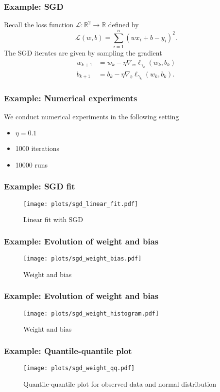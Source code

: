 \documentclass[17pt,institute=e10]{tuhh_presentation}
\newcommand{\R}{\mathbb{R}}
\newcommand{\CL}{\mathcal{L}}
\begin{document}
\begin{frame}[fragile]
  \frametitle{Example: SGD}
  Recall the loss function $\CL : \R^2 \rightarrow \R$ defined by
  \begin{equation*}
    \CL(w,b) = \sum_{i = 1}^{n} \left(w x_i + b - y_i\right)^2.
  \end{equation*}
  The SGD iterates are given by sampling the gradient
  \begin{align*}
    w_{k+1} &= w_k - \eta \nabla_w \ell_{\gamma_k}(w_k, b_k) \\
    b_{k+1} &= b_k - \eta \nabla_b \ell_{\gamma_k}(w_k, b_k).
  \end{align*}
\end{frame}
\begin{frame}[fragile]
  \frametitle{Example: Numerical experiments}
    We conduct numerical experiments in the following setting
    \begin{itemize}
      \item $\eta = 0.1$
      \item 1000 iterations 
      \item 10000 runs
    \end{itemize}
\end{frame}
\begin{frame}[fragile]
  \frametitle{Example: SGD fit}
    \vspace{-1cm}
    \begin{figure}
      \centering
      \texttt{[image: plots/sgd\_linear\_fit.pdf]}
      \caption{Linear fit with SGD}
    \end{figure}
\end{frame}
\begin{frame}[fragile]
  \frametitle{Example: Evolution of weight and bias}
    \vspace{-1cm}
    \begin{figure}
      \centering
      \texttt{[image: plots/sgd\_weight\_bias.pdf]}
      \caption{Weight and bias}
    \end{figure}
\end{frame}
\begin{frame}[fragile]
  \frametitle{Example: Evolution of weight and bias}
    \vspace{-1cm}
    \begin{figure}
      \centering
      \texttt{[image: plots/sgd\_weight\_histogram.pdf]}
      \caption{Weight and bias}
    \end{figure}
\end{frame}
\begin{frame}[fragile]
  \frametitle{Example: Quantile-quantile plot}
    \vspace{-1cm}
    \begin{figure}
      \centering
      \texttt{[image: plots/sgd\_weight\_qq.pdf]}
      \caption{Quantile-quantile plot for observed data and normal distribution}
    \end{figure}
\end{frame}
\end{document}
